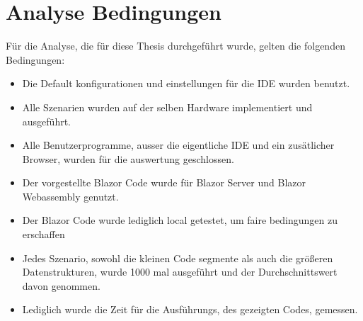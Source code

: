 \section{Analyse Bedingungen}
\label{sec:bedingungen}
Für die Analyse, die für diese Thesis durchgeführt wurde, gelten die folgenden Bedingungen:

\begin{itemize}
    \item Die Default konfigurationen und einstellungen für die IDE wurden benutzt.
    \item Alle Szenarien wurden auf der selben Hardware implementiert und ausgeführt.
    \item Alle Benutzerprogramme, ausser die eigentliche IDE und ein zusätlicher Browser, wurden
    für die auswertung geschlossen.
    \item Der vorgestellte Blazor Code wurde für Blazor Server und Blazor Webassembly genutzt.
    \item Der Blazor Code wurde lediglich local getestet, um faire bedingungen zu erschaffen
    \item Jedes Szenario, sowohl die kleinen Code segmente als auch die größeren Datenstrukturen,
    wurde 1000 mal ausgeführt und der Durchschnittswert davon genommen.
    \item Lediglich wurde die Zeit für die Ausführungs, des gezeigten Codes, gemessen.
\end{itemize}